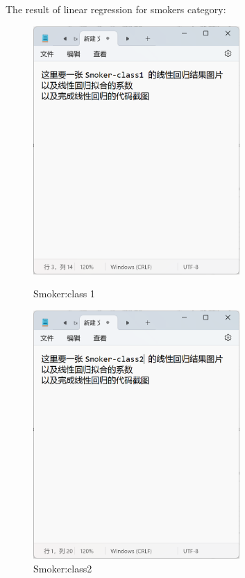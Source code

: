 \documentclass[12pt,a4paper]{article}
\begin{document}
The result of linear regression for smokers category:
\begin{figure}[H]
\begin{minipage}[t]{0.48\textwidth}
\centering
\includegraphics[width = 0.7\textwidth]{regression_smoker_class1.png}
\caption{Smoker:class 1}
\end{minipage}
\begin{minipage}[t]{0.48\textwidth}
\centering
\includegraphics[width = 0.7\textwidth]{regression_smoker_class2.png}
\caption{Smoker:class2}
\end{minipage}
\end{figure}
\end{document}

